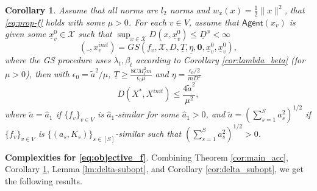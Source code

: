 \documentclass[10pt]{article}
\newcommand{\mc}{\mathcal}
\newcommand{\mb}{\mathbf}
\newcommand{\agent}{\mathsf{Agent}}
\newtheorem{corollary}{Corollary}[section]
\begin{document}
\begin{corollary}\label{cor:good_init_CS}
Assume that all norms are $l_2$ norms and $w_x(x)=  \frac{1}{2}\|x\|^2$, that \eqref{eq:prop-f} holds with some $\mu>0$. For each $v\in V$, assume that $\agent(x_v)$ is given some $\underline{x}_v^0\in \mc X$ such that $\sup_{x\in \mc X} D(x,\underline{x}_v^0)\leq \underline{D}^x<\infty$
    \begin{displaymath}
    (\_,x_v^{init}) = GS(f_v,\mc X, D,\underline{T},\underline{\eta},\mb 0,\underline{x}_v^0,\underline{x}_v^0), 
\end{displaymath}
where the GS procedure uses $\lambda_t,\beta_t$ according to Corollary \ref{cor:lambda_beta} (for $\mu>0$), then with $\epsilon_0 = \widetilde{a}^2/\mu$, $\underline{T} \geq \frac{8CM_f^2m}{\epsilon_0\mu}$ and $\underline{\eta} = \frac{\epsilon_0/2}{m\underline{D}^x}$
\begin{displaymath}
    D(X^*,X^{init}) \leq \frac{4\widetilde{a}^2}{\mu^2} ,
\end{displaymath}
where $\widetilde{a} = \widehat{a}_1$ if $\{f_v\}_{v\in V}$ is $\widehat{a}_1$-similar for some $\widehat{a}_1>0$, and $\widetilde{a} = (\sum_{s=1}^S a_s^2)^{1/2}$ if $\{f_v\}_{v\in V}$ is $\{(a_s,K_s)\}_{s\in [S]}$-similar such that $(\sum_{s=1}^S a_s^2)^{1/2}>0$. 
\end{corollary}






\textbf{Complexities for \eqref{eq:objective_f}}. Combining Theorem \ref{cor:main_acc}, Corollary \ref{cor:good_init_CS}, Lemma \ref{lm:delta-subopt}, and Corollary \ref{cor:delta_subopt}, we get the following results.  
\end{document}
